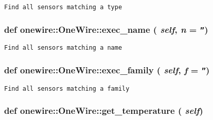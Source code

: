 \footnotesize\begin{verbatim}
Find all sensors matching a type
\end{verbatim}
\normalsize
 \hypertarget{classonewire_1_1OneWire_db399d215bf72b5084d5cbbefbdd62a9}{
\subsubsection[exec\_\-name]{\setlength{\rightskip}{0pt plus 5cm}def onewire::OneWire::exec\_\-name ( {\em self}, \/   {\em n} = {\tt ''})}}
\label{classonewire_1_1OneWire_db399d215bf72b5084d5cbbefbdd62a9}




\footnotesize\begin{verbatim}
Find all sensors matching a name
\end{verbatim}
\normalsize
 \hypertarget{classonewire_1_1OneWire_23324150ab22b72b6c32054003b400fd}{
\subsubsection[exec\_\-family]{\setlength{\rightskip}{0pt plus 5cm}def onewire::OneWire::exec\_\-family ( {\em self}, \/   {\em f} = {\tt ''})}}
\label{classonewire_1_1OneWire_23324150ab22b72b6c32054003b400fd}




\footnotesize\begin{verbatim}
Find all sensors matching a family
\end{verbatim}
\normalsize
 \hypertarget{classonewire_1_1OneWire_ece120e9964b38335bf23a7028d45083}{
\subsubsection[get\_\-temperature]{\setlength{\rightskip}{0pt plus 5cm}def onewire::OneWire::get\_\-temperature ( {\em self})}}
\label{classonewire_1_1OneWire_ece120e9964b38335bf23a7028d45083}




